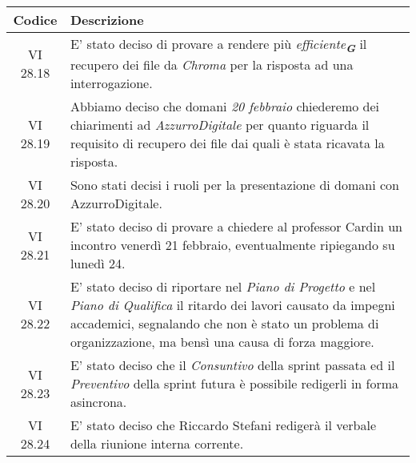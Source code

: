 \newpage

\begin{table}[htbp]
    \centering
    \begin{tabular}{|c|p{}|}
        \hline
        \rowcolor[gray]{0.75}
        \textbf{Codice} & \textbf{Descrizione}\\
        \hline
        VI 28.18 & E' stato deciso di provare a rendere più \emph{efficiente}\textsubscript{\textit{\textbf{G}}} il recupero dei file
        da \emph{Chroma} per la risposta ad una interrogazione.\\
        \hline
        VI 28.19 & Abbiamo deciso che domani \emph{20 febbraio} chiederemo dei chiarimenti ad \emph{AzzurroDigitale} per quanto riguarda
        il requisito di recupero dei file dai quali è stata ricavata la risposta.\\
        \hline
        VI 28.20 & Sono stati decisi i ruoli per la presentazione di domani con AzzurroDigitale.\\
        \hline
        VI 28.21 & E' stato deciso di provare a chiedere al professor Cardin un incontro venerdì 21 febbraio, eventualmente
        ripiegando su lunedì 24.\\
        \hline
        VI 28.22 & E' stato deciso di riportare nel \emph{Piano di Progetto} e nel \emph{Piano di Qualifica} il ritardo dei lavori
        causato da impegni accademici, segnalando che non è stato un problema di organizzazione, ma bensì una causa di forza maggiore.\\
        \hline
        VI 28.23 & E' stato deciso che il \emph{Consuntivo} della sprint passata ed il \emph{Preventivo} della sprint futura è
        possibile redigerli in forma asincrona.\\
        \hline
        VI 28.24 & E' stato deciso che Riccardo Stefani redigerà il verbale della riunione interna corrente.\\
        \hline
    \end{tabular}
\end{table}

